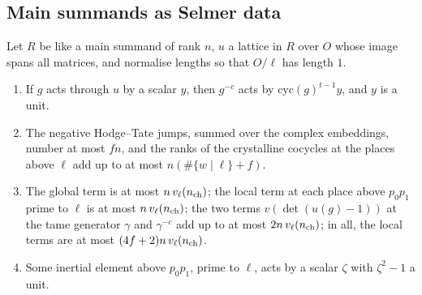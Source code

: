 \subsection{Main summands as Selmer data}\label{ss:main-summand-data}

\begin{lemma}\label{lem:main-summand-terms}
Let $R$ be like a main summand of rank $n$, $u$ a lattice in $R$ over $O$ whose image spans all matrices, and normalise lengths so that $O/\ell$ has length $1$.
\begin{enumerate}[label=\textup{(\alph*)}]
\item If $g$ acts through $u$ by a scalar $y$, then $g^{-c}$ acts by $\mathrm{cyc}(g)^{t-1}y$, and $y$ is a unit.
\item The negative Hodge--Tate jumps, summed over the complex embeddings, number at most $fn$, and the ranks of the crystalline cocycles at the places above $\ell$ add up to at most $n(\#\{w\mid\ell\}+f)$.
\item The global term is at most $n\,v_\ell(n_{\rm ch})$; the local term at each place above $p_0p_1$ prime to $\ell$ is at most $n\,v_\ell(n_{\rm ch})$; the two terms $v(\det(u(g)-1))$ at the tame generator $\gamma$ and $\gamma^{-c}$ add up to at most $2n\,v_\ell(n_{\rm ch})$; in all, the local terms are at most $(4f+2)n\,v_\ell(n_{\rm ch})$.
\item Some inertial element above $p_0p_1$, prime to $\ell$, acts by a scalar $\zeta$ with $\zeta^2-1$ a unit.
\end{enumerate}
\end{lemma}

